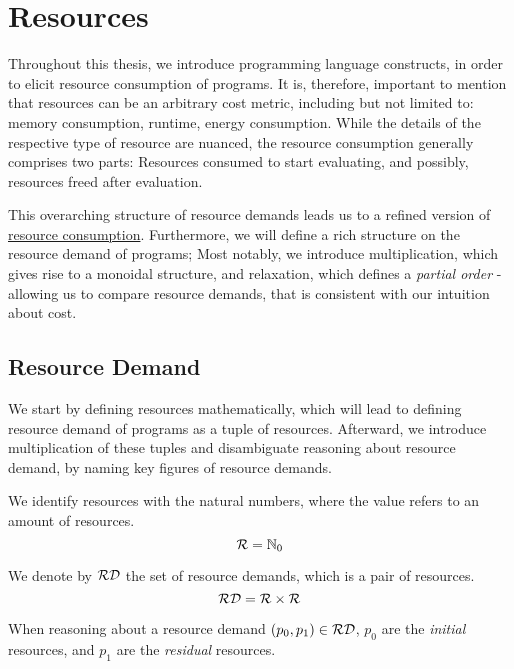 \chapter{Resources}

Throughout this thesis, we introduce programming language constructs, in order to elicit resource consumption of programs. It is, therefore, important to mention that resources can be an arbitrary cost metric, including but not limited to: memory consumption, runtime, energy consumption. While the details of the respective type of resource are nuanced, the resource consumption generally comprises two parts: Resources consumed to start evaluating, and possibly, resources freed after evaluation.

This overarching structure of resource demands leads us to a refined version of \href{def:resource-consumption}{resource consumption}. Furthermore, we will define a rich structure on the resource demand of programs; Most notably, we introduce multiplication, which gives rise to a monoidal structure, and relaxation, which defines a \emph{partial order} - allowing us to compare resource demands, that is consistent with our intuition about cost.

\section{Resource Demand}

We start by defining resources mathematically, which will lead to defining resource demand of programs as a tuple of resources. Afterward, we introduce multiplication of these tuples and disambiguate reasoning about resource demand, by naming key figures of resource demands.

\begin{definition}[Resources]\label{def:resources}
   We identify resources with the natural numbers, where the value refers to an amount of resources.
   \[
      \mathcal{R} = \mathbb{N}_0
   \]
\end{definition}


\begin{definition}\label{def:resource-pair}
   We denote by \(\mathcal{RD}\) the set of resource demands, which is a pair of resources.
   \[
      \mathcal{RD} = \mathcal{R} \times \mathcal{R}
   \]
\end{definition}

When reasoning about a resource demand \((p_0, p_1) \in \mathcal{RD}\), \(p_0\) are the \emph{initial} resources, and \(p_1\) are the \emph{residual} resources. 

